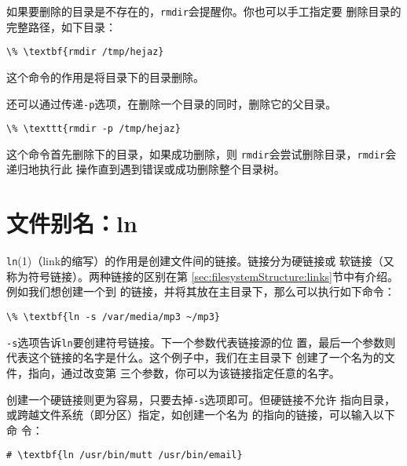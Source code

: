 如果要删除的目录是不存在的，\texttt{rmdir}会提醒你。你也可以手工指定要
删除目录的完整路径，如下目录：
\begin{Verbatim}[frame=single, commandchars=\\\{\}]
\% \textbf{rmdir /tmp/hejaz}
\end{Verbatim}
这个命令的作用是将目录下的目录删除。

还可以通过传递\texttt{-p}选项，在删除一个目录的同时，删除它的父目录。
\begin{Verbatim}[frame=single, commandchars=\\\{\}]
\% \texttt{rmdir -p /tmp/hejaz}
\end{Verbatim}
这个命令首先删除下的目录，如果成功删除，则
\texttt{rmdir}会尝试删除目录，\texttt{rmdir}会递归地执行此
操作直到遇到错误或成功删除整个目录树。

\section{文件别名：ln}
\label{sec:handlingFilesAndDirectories:aliasing}
\texttt{ln}(1)（link的缩写）的作用是创建文件间的链接。链接分为硬链接或
软链接（又称为符号链接）。两种链接的区别在第
\ref{sec:filesystemStructure:links}节中有介绍。例如我们想创建一个到
的链接，并将其放在主目录下，那么可以执行如下命令：
\begin{Verbatim}[frame=single, commandchars=\\\{\}]
\% \textbf{ln -s /var/media/mp3 ~/mp3}
\end{Verbatim}

\texttt{-s}选项告诉\texttt{ln}要创建符号链接。下一个参数代表链接源的位
置，最后一个参数则代表这个链接的名字是什么。这个例子中，我们在主目录下
创建了一个名为的文件，指向，通过改变第
三个参数，你可以为该链接指定任意的名字。

创建一个硬链接则更为容易，只要去掉\texttt{-s}选项即可。但硬链接不允许
指向目录，或跨越文件系统（即分区）指定，如创建一个名为
的指向的链接，可以输入以下命
令：
\begin{Verbatim}[frame=single, commandchars=\\\{\}]
# \textbf{ln /usr/bin/mutt /usr/bin/email}
\end{Verbatim}






